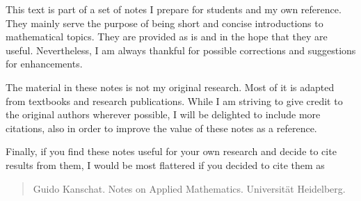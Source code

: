 This text is part of a set of notes I prepare for students and my own
reference. They mainly serve the purpose of being short and concise
introductions to mathematical topics. They are provided as is and in
the hope that they are useful. Nevertheless, I am always thankful for
possible corrections and suggestions for enhancements.

The material in these notes is not my original research. Most of it is
adapted from textbooks and research publications. While I am striving
to give credit to the original authors wherever possible, I will be
delighted to include more citations, also in order to improve the
value of these notes as a reference.

Finally, if you find these notes useful for your own research and
decide to cite results from them, I would be most flattered if you
decided to cite them as
\begin{verse}
  Guido Kanschat. Notes on Applied Mathematics. Universität
  Heidelberg.
\end{verse}

